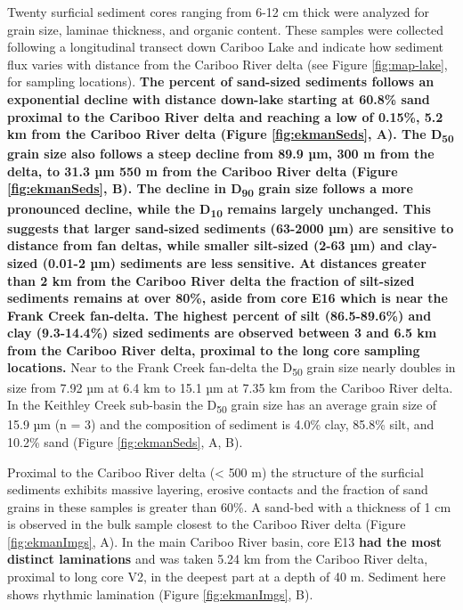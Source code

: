 \documentclass[Royal,times,doublespace,sageh]{sagej}
\begin{document}
Twenty surficial sediment cores ranging from 6-12 cm thick were analyzed
for grain size, laminae thickness, and organic content. These samples
were collected following a longitudinal transect down Cariboo Lake and
indicate how sediment flux varies with distance from the Cariboo River
delta (see Figure \ref{fig:map-lake}, for sampling locations).
\textbf{The percent of sand-sized sediments follows an exponential
decline with distance down-lake starting at 60.8\% sand proximal to the
Cariboo River delta and reaching a low of 0.15\%, 5.2 km from the
Cariboo River delta (Figure \ref{fig:ekmanSeds}, A). The
D\textsubscript{50} grain size also follows a steep decline from 89.9
µm, 300 m from the delta, to 31.3 µm 550 m from the Cariboo River delta
(Figure \ref{fig:ekmanSeds}, B). The decline in D\textsubscript{90}
grain size follows a more pronounced decline, while the
D\textsubscript{10} remains largely unchanged. This suggests that larger
sand-sized sediments (63-2000 µm) are sensitive to distance from fan
deltas, while smaller silt-sized (2-63 µm) and clay-sized (0.01-2 µm)
sediments are less sensitive. At distances greater than 2 km from the
Cariboo River delta the fraction of silt-sized sediments remains at over
80\%, aside from core E16 which is near the Frank Creek fan-delta. The
highest percent of silt (86.5-89.6\%) and clay (9.3-14.4\%) sized
sediments are observed between 3 and 6.5 km from the Cariboo River
delta, proximal to the long core sampling locations.} Near to the Frank
Creek fan-delta the D\textsubscript{50} grain size nearly doubles in
size from 7.92 µm at 6.4 km to 15.1 µm at 7.35 km from the Cariboo River
delta. In the Keithley Creek sub-basin the D\textsubscript{50} grain
size has an average grain size of 15.9 µm (n = 3) and the composition of
sediment is 4.0\% clay, 85.8\% silt, and 10.2\% sand (Figure
\ref{fig:ekmanSeds}, A, B).

Proximal to the Cariboo River delta (\textless{} 500 m) the structure of
the surficial sediments exhibits massive layering, erosive contacts and
the fraction of sand grains in these samples is greater than 60\%. A
sand-bed with a thickness of 1 cm is observed in the bulk sample closest
to the Cariboo River delta (Figure \ref{fig:ekmanImgs}, A). In the main
Cariboo River basin, core E13 \textbf{had the most distinct laminations}
and was taken 5.24 km from the Cariboo River delta, proximal to long
core V2, in the deepest part at a depth of 40 m. Sediment here shows
rhythmic lamination (Figure \ref{fig:ekmanImgs}, B).
\end{document}

